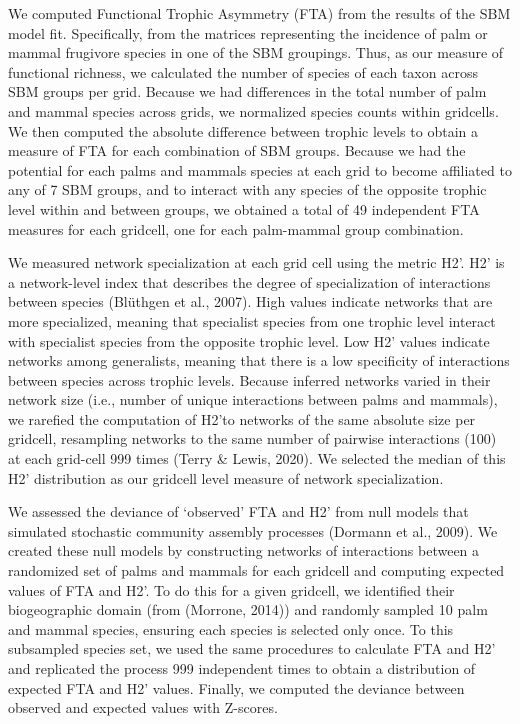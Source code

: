 \documentclass[
]{agujournal2019}
\begin{document}
We computed Functional Trophic Asymmetry (FTA) from the results of the
SBM model fit. Specifically, from the matrices representing the
incidence of palm or mammal frugivore species in one of the SBM
groupings. Thus, as our measure of functional richness, we calculated
the number of species of each taxon across SBM groups per grid. Because
we had differences in the total number of palm and mammal species across
grids, we normalized species counts within gridcells. We then computed
the absolute difference between trophic levels to obtain a measure of
FTA for each combination of SBM groups. Because we had the potential for
each palms and mammals species at each grid to become affiliated to any
of 7 SBM groups, and to interact with any species of the opposite
trophic level within and between groups, we obtained a total of 49
independent FTA measures for each gridcell, one for each palm-mammal
group combination.

We measured network specialization at each grid cell using the metric
H2'. H2' is a network-level index that describes the degree of
specialization of interactions between species (Blüthgen et al., 2007).
High values indicate networks that are more specialized, meaning that
specialist species from one trophic level interact with specialist
species from the opposite trophic level. Low H2' values indicate
networks among generalists, meaning that there is a low specificity of
interactions between species across trophic levels. Because inferred
networks varied in their network size (i.e., number of unique
interactions between palms and mammals), we rarefied the computation of
H2'to networks of the same absolute size per gridcell, resampling
networks to the same number of pairwise interactions (100) at each
grid-cell 999 times (Terry \& Lewis, 2020). We selected the median of
this H2' distribution as our gridcell level measure of network
specialization.

We assessed the deviance of `observed' FTA and H2' from null models that
simulated stochastic community assembly processes (Dormann et al.,
2009). We created these null models by constructing networks of
interactions between a randomized set of palms and mammals for each
gridcell and computing expected values of FTA and H2'. To do this for a
given gridcell, we identified their biogeographic domain (from (Morrone,
2014)) and randomly sampled 10 palm and mammal species, ensuring each
species is selected only once. To this subsampled species set, we used
the same procedures to calculate FTA and H2' and replicated the process
999 independent times to obtain a distribution of expected FTA and H2'
values. Finally, we computed the deviance between observed and expected
values with Z-scores.
\end{document}
